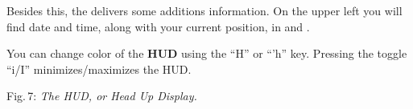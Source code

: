 Besides this, the  delivers some additions information. On the upper
left you will find date and time, along with your current position, in 
and . 

You can change color of the \textbf{HUD} using the ``H'' or ``'h''  key.
Pressing the toggle ``i/I'' minimizes/maximizes the HUD.

\medskip

 \centerline{}

\smallskip
 \noindent
Fig.\,7: \textit{The HUD, or Head Up Display.}
\medskip

